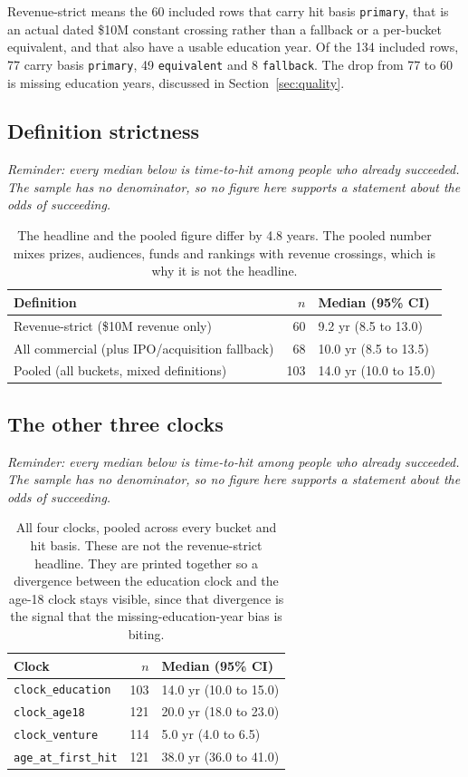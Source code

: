\documentclass[11pt]{article}
\newcommand{\caveat}{\emph{\small Reminder: every median below is time-to-hit
among people who already succeeded. The sample has no denominator, so no figure
here supports a statement about the odds of succeeding.}\par\medskip}
\begin{document}
Revenue-strict means the 60 included rows that carry hit basis
\texttt{primary}, that is an actual dated \$10M constant crossing rather than a
fallback or a per-bucket equivalent, and that also have a usable education
year. Of the 134 included rows, 77 carry basis \texttt{primary}, 49
\texttt{equivalent} and 8 \texttt{fallback}. The drop from 77 to 60 is missing
education years, discussed in Section~\ref{sec:quality}.

\subsection{Definition strictness}

\caveat

\begin{table}[h]
\centering
\begin{tabular}{lrl}
\toprule
Definition & $n$ & Median (95\% CI) \\
\midrule
Revenue-strict (\$10M revenue only)             & 60  & 9.2 yr (8.5 to 13.0) \\
All commercial (plus IPO/acquisition fallback)  & 68  & 10.0 yr (8.5 to 13.5) \\
Pooled (all buckets, mixed definitions)         & 103 & 14.0 yr (10.0 to 15.0) \\
\bottomrule
\end{tabular}
\caption{The headline and the pooled figure differ by 4.8 years. The pooled
number mixes prizes, audiences, funds and rankings with revenue crossings,
which is why it is not the headline.}
\end{table}

\subsection{The other three clocks}

\caveat

\begin{table}[h]
\centering
\begin{tabular}{lrl}
\toprule
Clock & $n$ & Median (95\% CI) \\
\midrule
\texttt{clock\_education}   & 103 & 14.0 yr (10.0 to 15.0) \\
\texttt{clock\_age18}       & 121 & 20.0 yr (18.0 to 23.0) \\
\texttt{clock\_venture}     & 114 & 5.0 yr (4.0 to 6.5) \\
\texttt{age\_at\_first\_hit}& 121 & 38.0 yr (36.0 to 41.0) \\
\bottomrule
\end{tabular}
\caption{All four clocks, pooled across every bucket and hit basis. These are
not the revenue-strict headline. They are printed together so a divergence
between the education clock and the age-18 clock stays visible, since that
divergence is the signal that the missing-education-year bias is biting.}
\end{table}
\end{document}
